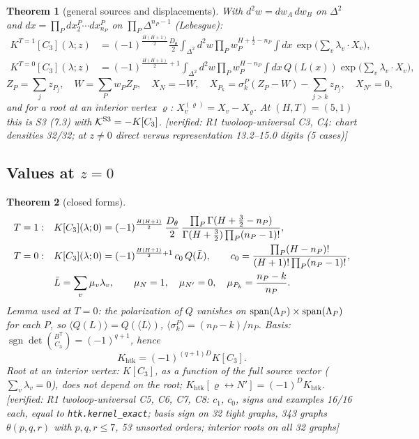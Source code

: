 \documentclass[10pt,a4paper]{article}
\numberwithin{equation}{section}
\newtheorem{theorem}{Theorem}[section]
\theoremstyle{definition}
\theoremstyle{remark}
\newcommand{\sgn}{\operatorname{sgn}}
\newcommand{\ver}[1]{\textup{[verified: #1]}}
\newcommand{\htk}{\mathrm{htk}}
\begin{document}
\begin{theorem}[general sources and displacements]\label{thm-intrep}
With $d^2w=dw_A\,dw_B$ on $\Delta^2$ and $dx=\prod_Pdx^P_2\cdots dx^P_{n_P}$ on $\prod_P\Delta^{n_P-1}$ (Lebesgue):
\begin{align}
K^{T=1}[C_3](\lambda;z)&=(-1)^{\frac{H(H+1)}2}\frac{D_\theta}2\int_{\Delta^2}d^2w\prod_Pw_P^{H+\frac12-n_P}\int dx\,\exp\Big(\sum_v\lambda_v\cdot X_v\Big),\\
K^{T=0}[C_3](\lambda;z)&=(-1)^{\frac{H(H+1)}2+1}\int_{\Delta^2}d^2w\prod_Pw_P^{H-n_P}\int dx\,Q(L(x))\exp\Big(\sum_v\lambda_v\cdot X_v\Big),
\end{align}
\begin{equation}
Z_P=\sum_jz_{P_j},\quad W=\sum_Pw_PZ_P,\quad X_N=-W,\quad X_{P_k}=\sigma^P_k(Z_P-W)-\sum_{j>k}z_{P_j},\quad X_{N'}=0,
\end{equation}
and for a root at an interior vertex $\varrho$: $X^{(\varrho)}_v=X_v-X_\varrho$. At $(H,T)=(5,1)$ this is S3 (7.3) with $\mathcal K^{\rm S3}=-K[C_3]$.
\ver{R1 twoloop-universal C3, C4: chart densities 32/32; at $z\neq0$ direct versus representation 13.2--15.0 digits (5 cases)}
\end{theorem}

\subsection{\texorpdfstring{Values at $z=0$}{Values at z=0}}

\begin{theorem}[closed forms]\label{thm-closed}
\begin{align}
T=1:&\quad K[C_3](\lambda;0)=(-1)^{\frac{H(H+1)}2}\,\frac{D_\theta}2\,\frac{\prod_P\Gamma(H+\frac32-n_P)}{\Gamma(H+\frac32)\prod_P(n_P-1)!},\label{eq-T1}\\
T=0:&\quad K[C_3](\lambda;0)=(-1)^{\frac{H(H+1)}2+1}\,c_0\,Q(\bar L),\qquad c_0=\frac{\prod_P(H-n_P)!}{(H+1)!\prod_P(n_P-1)!},\label{eq-T0}\\
&\quad \bar L=\sum_v\mu_v\lambda_v,\qquad \mu_N=1,\quad\mu_{N'}=0,\quad \mu_{P_k}=\frac{n_P-k}{n_P}.\notag
\end{align}
Lemma used at $T=0$: the polarization of $Q$ vanishes on ${\rm span}(\Lambda_P)\times{\rm span}(\Lambda_P)$ for each $P$, so $\langle Q(L)\rangle=Q(\langle L\rangle)$, $\langle\sigma^P_k\rangle=(n_P-k)/n_P$. Basis: $\sgn\det\binom{B^{\mathsf T}}{C_3}=(-1)^{q+1}$, hence
\begin{equation}
K_\htk=(-1)^{(q+1)D}K[C_3].
\end{equation}
Root at an interior vertex: $K[C_3]$, as a function of the full source vector ($\sum_v\lambda_v=0$), does not depend on the root; $K_\htk[\varrho\leftrightarrow N']=(-1)^DK_\htk$.
\ver{R1 twoloop-universal C5, C6, C7, C8: $c_1$, $c_0$, signs and examples 16/16 each, equal to \texttt{htk.kernel\_exact}; basis sign on 32 tight graphs, 343 graphs $\theta(p,q,r)$ with $p,q,r\le7$, 53 unsorted orders; interior roots on all 32 graphs}
\end{theorem}
\end{document}
